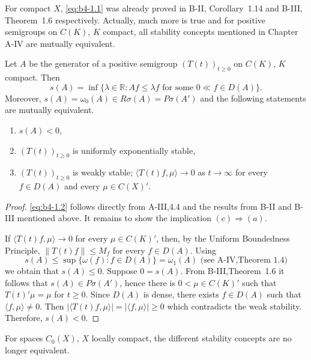 For compact $X$, \eqref{eq:b4-1.1} was already proved in B-II, Corollary~1.14 and B-III, Theorem~1.6 respectively. 
Actually, much more is true and for positive semigroups on $C(K)$, $K$ compact, all stability concepts mentioned in Chapter A-IV are mutually equivalent.

\begin{theorem}\label{thm:b4-1.1}%
Let $A$ be the generator of a positive semigroup $(T(t))_{t \geq 0}$ on $C(K)$, $K$ compact. Then
\begin{equation}\label{eq:b4-1.2}
   s(A) = \inf \{\lambda \in \mathbb{R} \colon Af \leq \lambda f \text{ for some } 0 \ll f \in D(A)\} .
\end{equation}
Moreover, $s(A) = \omega_{0}(A) \in R\sigma(A) = P\sigma(A')$ and the following statements are mutually equivalent.
\begin{enumerate}[\upshape (a)]
\item $s(A) < 0$,
\item $(T(t))_{t \geq 0}$ is uniformly exponentially stable,
\item $(T(t))_{t \geq 0}$ is weakly stable; \ie $\langle T(t)f,\mu \rangle \to 0$ as $t \to \infty$ for every $f \in D(A)$ and every $\mu \in C(X)'$.
\end{enumerate}
\end{theorem}
\begin{proof}
\eqref{eq:b4-1.2} follows directly from A-III,4.4 and the results from B-II and B-III mentioned above. 
It remains to show the implication $(c) \Rightarrow (a)$.

If $\langle T(t)f,\mu \rangle \to 0$ for every $\mu \in C(K)'$, then, by the Uniform Boundedness Principle, $\|T(t)f\| \leq M_f$ for every $f \in D(A)$.
Using 
\[
s(A) \leq \sup \{\omega(f)\colon f \in D(A)\} = \omega_1(A)
\text{ (see A-IV,Theorem~1.4)}
\]
we obtain that $s(A) \leq 0$. 
Suppose $0 = s(A)$. 
From B-III,Theorem~1.6 it follows that $s(A) \in P\sigma(A')$, hence there is $0 < \mu \in C(K)'$ such that $T(t)'\mu = \mu$ for $t \geq 0$. 
Since $D(A)$ is dense, there exists $f \in D(A)$ such that $\langle f,\mu \rangle \neq 0$. 
Then $|\langle T(t)f,\mu \rangle| = |\langle f,\mu \rangle|  \ge  0$ which contradicts the weak stability. Therefore, $s(A) < 0$.
\end{proof}
For spaces $C_{0}(X)$, $X$ locally compact, the different stability concepts are no longer equivalent.

